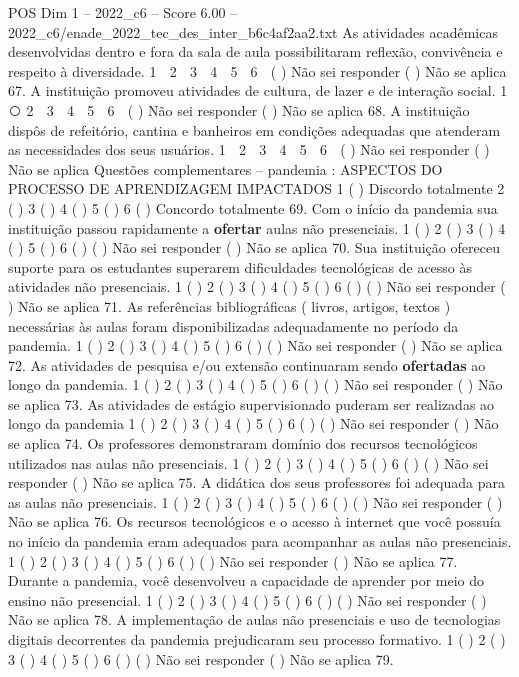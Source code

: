 \begin{textsample}{POS Dim 1 – 2022\_c6 – Score 6.00 – 2022\_c6/enade\_2022\_tec\_des\_inter\_b6c4af2aa2.txt}
As atividades acadêmicas desenvolvidas dentro e fora da sala de aula possibilitaram reflexão, convivência e respeito à diversidade. 1 ⃝ 2 ⃝ 3 ⃝ 4 ⃝ 5 ⃝ 6 ⃝ ( ) Não sei responder ( ) Não se aplica 67.
A instituição promoveu atividades de cultura, de lazer e de interação social. 1 ⃝ 2 ⃝ 3 ⃝ 4 ⃝ 5 ⃝ 6 ⃝ ( ) Não sei responder ( ) Não se aplica 68.
A instituição dispôs de refeitório, cantina e banheiros em condições adequadas que atenderam as necessidades dos seus usuários. 1 ⃝ 2 ⃝ 3 ⃝ 4 ⃝ 5 ⃝ 6 ⃝ ( ) Não sei responder ( ) Não se aplica Questões complementares – pandemia : ASPECTOS DO PROCESSO DE APRENDIZAGEM IMPACTADOS 1 ( ) Discordo totalmente 2 ( ) 3 ( ) 4 ( ) 5 ( ) 6 ( ) Concordo totalmente 69.
Com o início da pandemia sua instituição passou rapidamente a \textbf{ofertar} aulas não presenciais. 1 ( ) 2 ( ) 3 ( ) 4 ( ) 5 ( ) 6 ( ) ( ) Não sei responder ( ) Não se aplica 70.
Sua instituição ofereceu suporte para os estudantes superarem dificuldades tecnológicas de acesso às atividades não presenciais. 1 ( ) 2 ( ) 3 ( ) 4 ( ) 5 ( ) 6 ( ) ( ) Não sei responder ( ) Não se aplica 71.
As referências bibliográficas ( livros, artigos, textos ) necessárias às aulas foram disponibilizadas adequadamente no período da pandemia. 1 ( ) 2 ( ) 3 ( ) 4 ( ) 5 ( ) 6 ( ) ( ) Não sei responder ( ) Não se aplica 72.
As atividades de pesquisa e/ou extensão continuaram sendo \textbf{ofertadas} ao longo da pandemia. 1 ( ) 2 ( ) 3 ( ) 4 ( ) 5 ( ) 6 ( ) ( ) Não sei responder ( ) Não se aplica 73.
As atividades de estágio supervisionado puderam ser realizadas ao longo da pandemia 1 ( ) 2 ( ) 3 ( ) 4 ( ) 5 ( ) 6 ( ) ( ) Não sei responder ( ) Não se aplica 74.
Os professores demonstraram domínio dos recursos tecnológicos utilizados nas aulas não presenciais. 1 ( ) 2 ( ) 3 ( ) 4 ( ) 5 ( ) 6 ( ) ( ) Não sei responder ( ) Não se aplica 75.
A didática dos seus professores foi adequada para as aulas não presenciais. 1 ( ) 2 ( ) 3 ( ) 4 ( ) 5 ( ) 6 ( ) ( ) Não sei responder ( ) Não se aplica 76.
Os recursos tecnológicos e o acesso à internet que você possuía no início da pandemia eram adequados para acompanhar as aulas não presenciais. 1 ( ) 2 ( ) 3 ( ) 4 ( ) 5 ( ) 6 ( ) ( ) Não sei responder ( ) Não se aplica 77.
Durante a pandemia, você desenvolveu a capacidade de aprender por meio do ensino não presencial. 1 ( ) 2 ( ) 3 ( ) 4 ( ) 5 ( ) 6 ( ) ( ) Não sei responder ( ) Não se aplica 78.
A implementação de aulas não presenciais e uso de tecnologias digitais decorrentes da pandemia prejudicaram seu processo formativo. 1 ( ) 2 ( ) 3 ( ) 4 ( ) 5 ( ) 6 ( ) ( ) Não sei responder ( ) Não se aplica 79.

\end{textsample}
